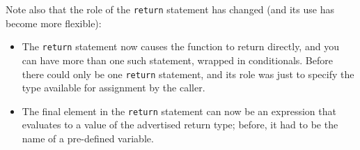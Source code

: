 Note also that the role of the \texttt{return} statement has changed
(and its use has become more flexible):

\begin{itemize}
\item The \texttt{return} statement now causes the function to return
  directly, and you can have more than one such statement, wrapped in
  conditionals. Before there could only be one \texttt{return}
  statement, and its role was just to specify the type available for
  assignment by the caller.
\item The final element in the \texttt{return} statement can now be an
  expression that evaluates to a value of the advertised return type;
  before, it had to be the name of a pre-defined variable.
\end{itemize}



